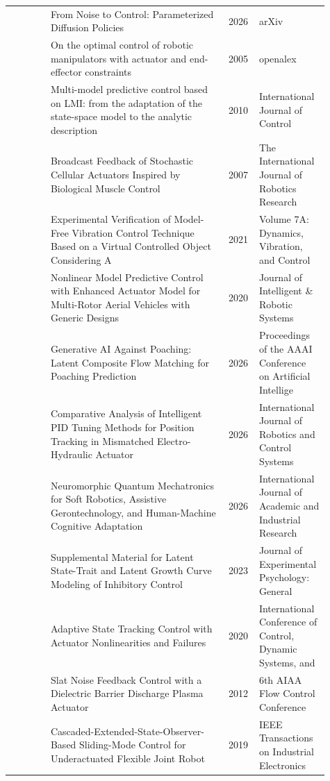 \documentclass{article}
\begin{document}
\begin{center}
\begin{longtable}{p{0.12\linewidth}p{0.53\linewidth}p{0.08\linewidth}p{0.18\linewidth}}
\citep{pool86_20} & From Noise to Control: Parameterized Diffusion Policies & 2026 & arXiv\\
\citep{pool86_21} & On the optimal control of robotic manipulators with actuator and end-effector constraints & 2005 & openalex\\
\citep{pool86_22} & Multi-model predictive control based on LMI: from the adaptation of the state-space model to the analytic description  & 2010 & International Journal of Control\\
\citep{pool86_23} & Broadcast Feedback of Stochastic Cellular Actuators Inspired by Biological Muscle Control & 2007 & The International Journal of Robotics Research\\
\citep{pool86_24} & Experimental Verification of Model-Free Vibration Control Technique Based on a Virtual Controlled Object Considering A & 2021 & Volume 7A: Dynamics, Vibration, and Control\\
\citep{pool86_25} & Nonlinear Model Predictive Control with Enhanced Actuator Model for Multi-Rotor Aerial Vehicles with Generic Designs & 2020 & Journal of Intelligent \& Robotic Systems\\
\citep{pool86_26} & Generative AI Against Poaching: Latent Composite Flow Matching for Poaching Prediction & 2026 & Proceedings of the AAAI Conference on Artificial Intellige\\
\citep{pool86_27} & Comparative Analysis of Intelligent PID Tuning Methods for Position Tracking in Mismatched Electro-Hydraulic Actuator & 2026 & International Journal of Robotics and Control Systems\\
\citep{pool86_28} & Neuromorphic Quantum Mechatronics for Soft Robotics, Assistive Gerontechnology, and Human-Machine Cognitive Adaptation & 2026 & International Journal of Academic and Industrial Research \\
\citep{pool86_29} & Supplemental Material for Latent State-Trait and Latent Growth Curve Modeling of Inhibitory Control & 2023 & Journal of Experimental Psychology: General\\
\citep{pool86_30} & Adaptive State Tracking Control with Actuator Nonlinearities and Failures & 2020 & International Conference of Control, Dynamic Systems, and \\
\citep{pool86_31} & Slat Noise Feedback Control with a Dielectric Barrier Discharge Plasma Actuator & 2012 & 6th AIAA Flow Control Conference\\
\citep{pool86_32} & Cascaded-Extended-State-Observer-Based Sliding-Mode Control for Underactuated Flexible Joint Robot & 2019 & IEEE Transactions on Industrial Electronics\\

\end{longtable}
\end{center}
\end{document}

